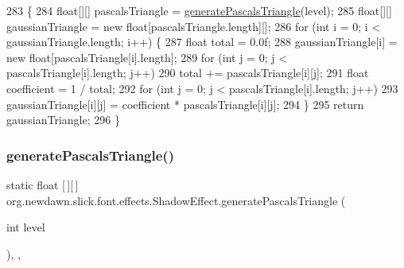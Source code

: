 \begin{DoxyCode}
283                                                                     \{
284         \textcolor{keywordtype}{float}[][] pascalsTriangle = \mbox{\hyperlink{classorg_1_1newdawn_1_1slick_1_1font_1_1effects_1_1_shadow_effect_a4045a468e4498b08516b172462f12d1a}{generatePascalsTriangle}}(level);
285         \textcolor{keywordtype}{float}[][] gaussianTriangle = \textcolor{keyword}{new} \textcolor{keywordtype}{float}[pascalsTriangle.length][];
286         \textcolor{keywordflow}{for} (\textcolor{keywordtype}{int} i = 0; i < gaussianTriangle.length; i++) \{
287             \textcolor{keywordtype}{float} total = 0.0f;
288             gaussianTriangle[i] = \textcolor{keyword}{new} \textcolor{keywordtype}{float}[pascalsTriangle[i].length];
289             \textcolor{keywordflow}{for} (\textcolor{keywordtype}{int} j = 0; j < pascalsTriangle[i].length; j++)
290                 total += pascalsTriangle[i][j];
291             \textcolor{keywordtype}{float} coefficient = 1 / total;
292             \textcolor{keywordflow}{for} (\textcolor{keywordtype}{int} j = 0; j < pascalsTriangle[i].length; j++)
293                 gaussianTriangle[i][j] = coefficient * pascalsTriangle[i][j];
294         \}
295         \textcolor{keywordflow}{return} gaussianTriangle;
296     \}
\end{DoxyCode}
\mbox{\label{classorg_1_1newdawn_1_1slick_1_1font_1_1effects_1_1_shadow_effect_a4045a468e4498b08516b172462f12d1a}} 
\subsubsection{\texorpdfstring{generate\+Pascals\+Triangle()}{generatePascalsTriangle()}}
{\footnotesize\ttfamily static float \mbox{[}$\,$\mbox{]}\mbox{[}$\,$\mbox{]} org.\+newdawn.\+slick.\+font.\+effects.\+Shadow\+Effect.\+generate\+Pascals\+Triangle (\begin{DoxyParamCaption}\item[{int}]{level }\end{DoxyParamCaption})\hspace{0.3cm}{\ttfamily [inline]}, {\ttfamily [static]}, {\ttfamily [private]}}

